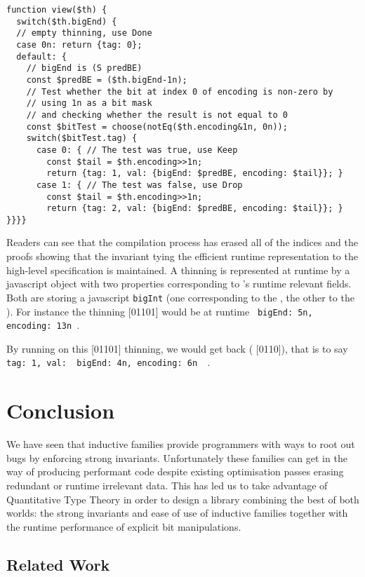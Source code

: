 \documentclass{article}
\begin{document}
\begin{verbatim}
function view($th) {
  switch($th.bigEnd) {
  // empty thinning, use Done
  case 0n: return {tag: 0};
  default: {
    // bigEnd is (S predBE)
    const $predBE = ($th.bigEnd-1n);
    // Test whether the bit at index 0 of encoding is non-zero by
    // using 1n as a bit mask
    // and checking whether the result is not equal to 0
    const $bitTest = choose(notEq($th.encoding&1n, 0n));
    switch($bitTest.tag) {
      case 0: { // The test was true, use Keep
        const $tail = $th.encoding>>1n;
        return {tag: 1, val: {bigEnd: $predBE, encoding: $tail}}; }
      case 1: { // The test was false, use Drop
        const $tail = $th.encoding>>1n;
        return {tag: 2, val: {bigEnd: $predBE, encoding: $tail}}; }
}}}}
\end{verbatim}

Readers can see that the compilation process has erased all of the indices
and the proofs
showing that the invariant tying the efficient runtime representation to the
high-level specification is maintained.
%
A thinning is represented at runtime by a javascript object with two properties
corresponding to 's runtime relevant fields. Both are storing a
javascript \texttt{bigInt} (one corresponding to the , the other
to the ).
%
For instance the thinning [01101] would be at runtime
\texttt{{ bigEnd: 5n, encoding: 13n }}.
%

By running  on this [01101] thinning, we would get
back ( [0110]), that is to say
\texttt{{ tag: 1, val: { bigEnd: 4n, encoding: 6n } }}.

\section{Conclusion}

We have seen that inductive families provide programmers with ways to root out bugs
by enforcing strong invariants. Unfortunately these families can get in the way of
producing performant code despite existing optimisation passes erasing redundant
or runtime irrelevant data.
%
This has led us to take advantage of Quantitative Type Theory in order to design a library
combining the best of both worlds: the strong invariants and ease of use of inductive
families together with the runtime performance of explicit bit manipulations.

\subsection{Related Work}
\end{document}
